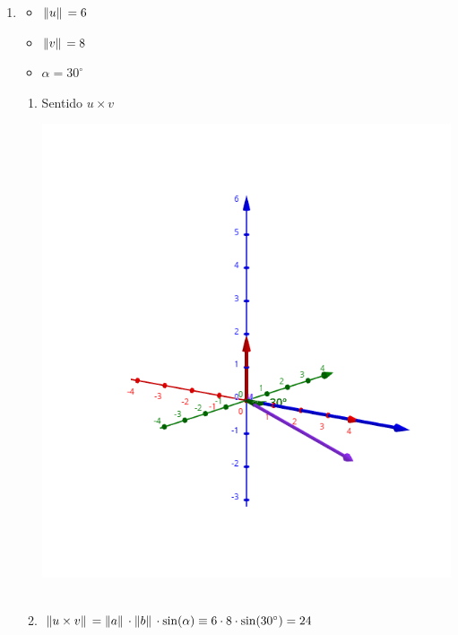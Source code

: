\documentclass[../practica_01.tex]{subfiles}
\begin{document}
\begin{enumerate}
        \item
            \begin{itemize}
                \item $\norm*{u} = 6$
                \item $\norm*{v} = 8$
                \item $\alpha = 30^\circ$
            \end{itemize}

            \begin{enumerate}
                \item Sentido $u \times v$

                    \includegraphics[scale=0.4]{ej11/resources/11b.png} $ $
                \item $\norm*{u \times v} = \norm*{a} \cdot \norm*{b} \cdot \sin(\alpha) \equiv 6 \cdot 8 \cdot \sin (30^\circ) = 24 $
            \end{enumerate}
    \end{enumerate}
\end{document}
